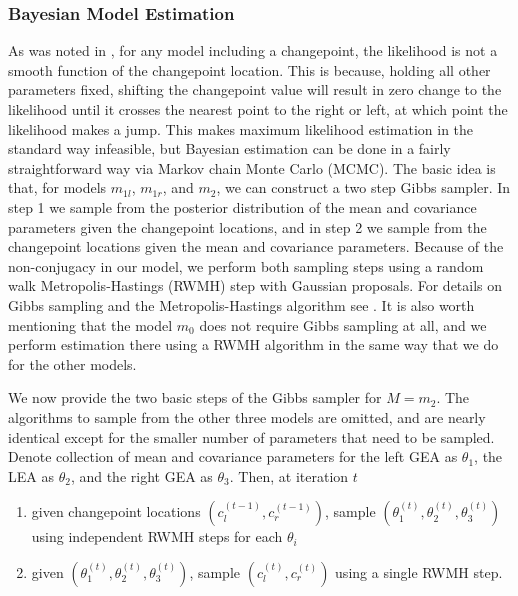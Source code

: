\documentclass[12pt]{article}
\providecommand{\tightlist}{%
  \setlength{\itemsep}{0pt}\setlength{\parskip}{0pt}}
\begin{document}
\subsubsection{Bayesian Model Estimation}

As was noted in \citet{stephens1994}, for any model including a
changepoint, the likelihood is not a smooth function of the changepoint
location. This is because, holding all other parameters fixed, shifting
the changepoint value will result in zero change to the likelihood until
it crosses the nearest point to the right or left, at which point the
likelihood makes a jump. This makes maximum likelihood estimation in the
standard way infeasible, but Bayesian estimation can be done in a fairly
straightforward way via Markov chain Monte Carlo (MCMC). The basic idea
is that, for models \(m_{1l}\), \(m_{1r}\), and \(m_2\), we can
construct a two step Gibbs sampler. In step 1 we sample from the
posterior distribution of the mean and covariance parameters given the
changepoint locations, and in step 2 we sample from the changepoint
locations given the mean and covariance parameters. Because of the
non-conjugacy in our model, we perform both sampling steps using a
random walk Metropolis-Hastings (RWMH) step with Gaussian proposals. For
details on Gibbs sampling and the Metropolis-Hastings algorithm see
\citet{gelman2013}. It is also worth mentioning that the model \(m_0\)
does not require Gibbs sampling at all, and we perform estimation there
using a RWMH algorithm in the same way that we do for the other models.

We now provide the two basic steps of the Gibbs sampler for \(M = m_2\).
The algorithms to sample from the other three models are omitted, and
are nearly identical except for the smaller number of parameters that
need to be sampled. Denote collection of mean and covariance parameters
for the left GEA as \(\theta_1\), the LEA as \(\theta_2\), and the right
GEA as \(\theta_3\). Then, at iteration \(t\)

\begin{enumerate}
\def\labelenumi{\arabic{enumi}.}
\tightlist
\item
  given changepoint locations \((c_l^{(t - 1)}, c_r^{(t - 1)})\), sample
  \((\theta_1^{(t)}, \theta_2^{(t)}, \theta_3^{(t)})\) using independent
  RWMH steps for each \(\theta_i\)
\item
  given \((\theta_1^{(t)}, \theta_2^{(t)}, \theta_3^{(t)})\), sample
  \((c_l^{(t)}, c_r^{(t)})\) using a single RWMH step.
\end{enumerate}
\end{document}
